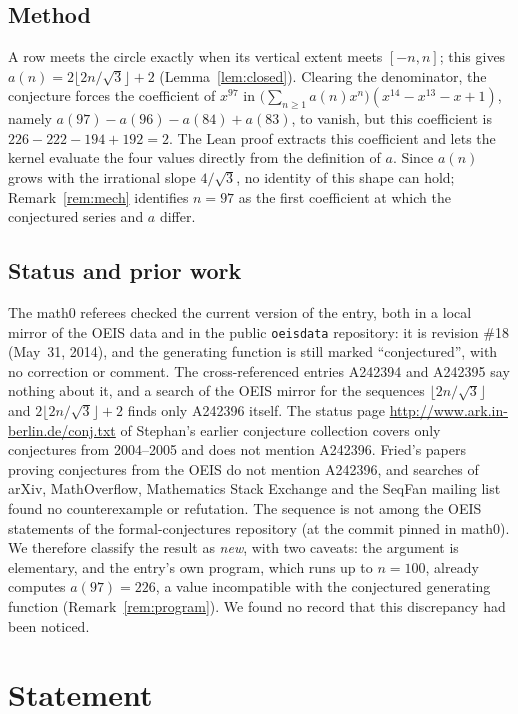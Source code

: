 \documentclass[11pt]{amsart}
\theoremstyle{plain}
\theoremstyle{definition}
\begin{document}
\subsection*{Method}
A row meets the circle exactly when its vertical extent meets $[-n,n]$; this gives $a(n)=2\lfloor 2n/\sqrt3\rfloor+2$ (Lemma~\ref{lem:closed}). Clearing the denominator, the conjecture forces the coefficient of $x^{97}$ in $\bigl(\sum_{n\ge1}a(n)x^n\bigr)(x^{14}-x^{13}-x+1)$, namely $a(97)-a(96)-a(84)+a(83)$, to vanish, but this coefficient is $226-222-194+192=2$. The Lean proof extracts this coefficient and lets the kernel evaluate the four values directly from the definition of $a$. Since $a(n)$ grows with the irrational slope $4/\sqrt3$, no identity of this shape can hold; Remark~\ref{rem:mech} identifies $n=97$ as the first coefficient at which the conjectured series and $a$ differ.

\subsection*{Status and prior work}
The math0 referees checked the current version of the entry, both in a local mirror of the OEIS data and in the public \texttt{oeisdata} repository: it is revision \#18 (May~31, 2014), and the generating function is still marked ``conjectured'', with no correction or comment. The cross-referenced entries A242394 and A242395 say nothing about it, and a search of the OEIS mirror for the sequences $\lfloor 2n/\sqrt3\rfloor$ and $2\lfloor 2n/\sqrt3\rfloor+2$ finds only A242396 itself. The status page \url{http://www.ark.in-berlin.de/conj.txt} of Stephan's earlier conjecture collection covers only conjectures from 2004--2005 and does not mention A242396. Fried's papers proving conjectures from the OEIS \cite{Fr24,Fr25,Fr26a,Fr26b} do not mention A242396, and searches of arXiv, MathOverflow, Mathematics Stack Exchange and the SeqFan mailing list found no counterexample or refutation. The sequence is not among the OEIS statements of the formal-conjectures repository \cite{FC} (at the commit pinned in math0). We therefore classify the result as \emph{new}, with two caveats: the argument is elementary, and the entry's own program, which runs up to $n=100$, already computes $a(97)=226$, a value incompatible with the conjectured generating function (Remark~\ref{rem:program}). We found no record that this discrepancy had been noticed.

\section{Statement}\label{sec:statement}
\end{document}
